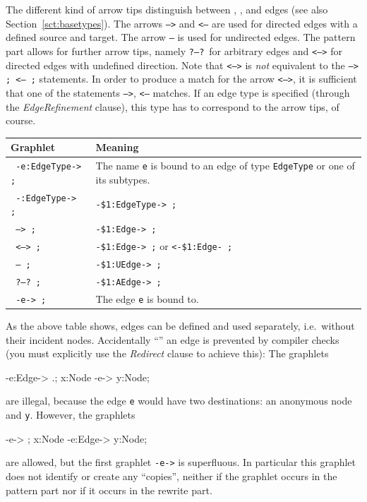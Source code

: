 The different kind of arrow tips distinguish between , , and  edges (see also Section~\ref{sct:basetypes}).
The arrows \texttt{-->} and \texttt{<--} are used for directed edges with a defined source and target.
The arrow \texttt{--} is used for undirected edges.
The pattern part allows for further arrow tips, namely \texttt{?--?}\ for arbitrary edges and \texttt{<-->} for directed edges with undefined direction.
Note that \texttt{<-->} is \emph{not} equivalent to the \texttt{--> ; <-- ;} statements.
In order to produce a match for the arrow \texttt{<-->}, it is sufficient that one of the statements \texttt{-->}, \texttt{<--} matches.
If an edge type is specified (through the \emph{EdgeRefinement} clause), this type has to correspond to the arrow tips, of course.
\begin{center}
	\begin{tabularx}{\linewidth}{lX}
		\textbf{Graphlet} & \textbf{Meaning}\\ \hline
		\texttt{ -e:EdgeType-> ;} & The name \texttt{e} is bound to an edge of type \texttt{EdgeType} or one of its subtypes. \\
		\texttt{ -:EdgeType-> ;} & \texttt{-\$1:EdgeType-> ;} \\
		\texttt{ --> ;} & \texttt{-\$1:Edge-> ;} \\
		\texttt{ <--> ;} & \texttt{-\$1:Edge-> ;} or  \texttt{<-\$1:Edge- ;}\\
		\texttt{ -- ;} & \texttt{-\$1:UEdge-> ;} \\
		\texttt{ ?--?\ ;} & \texttt{-\$1:AEdge-> ;} \\
		\texttt{ -e-> ;} & The edge \texttt{e} is bound to.
	\end{tabularx}
\end{center}
As the above table shows, edges can be defined and used separately, i.e.\ without their incident nodes.
Accidentally ``'' an edge is prevented by compiler checks (you must explicitly use the \emph{Redirect} clause to achieve this):
The graphlets
\begin{grgenlet}
-e:Edge-> .;
x:Node -e-> y:Node;
\end{grgenlet}
are illegal, because the edge \texttt{e} would have two destinations: an anonymous node and \texttt{y}.
However, the graphlets
\begin{grgenlet}
-e-> ;
x:Node -e:Edge-> y:Node;
\end{grgenlet}
are allowed, but the first graphlet \texttt{-e->} is superfluous. In particular this graphlet does not identify or create any ``copies'', neither if the graphlet occurs in the pattern part nor if it occurs in the rewrite part.
